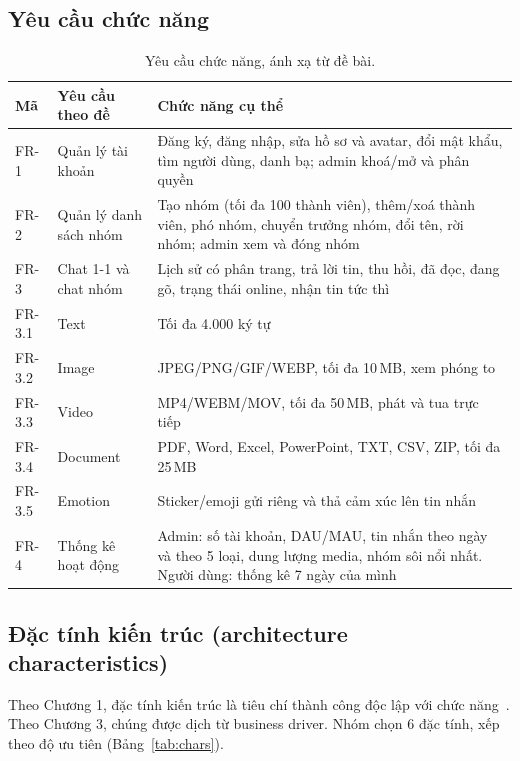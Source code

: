 \documentclass[11pt, a4paper]{article}
\begin{document}
\subsection{Yêu cầu chức năng}
\begin{table}[H]
  \centering
  \small
  \caption{Yêu cầu chức năng, ánh xạ từ đề bài.}
  \label{tab:fr}
  \begin{tabularx}{\linewidth}{llY}
    \toprule
    \textbf{Mã} & \textbf{Yêu cầu theo đề} & \textbf{Chức năng cụ thể} \\
    \midrule
    FR-1 & Quản lý tài khoản & Đăng ký, đăng nhập, sửa hồ sơ và avatar, đổi mật khẩu, tìm người dùng, danh bạ; admin khoá/mở và phân quyền \\
    FR-2 & Quản lý danh sách nhóm & Tạo nhóm (tối đa 100 thành viên), thêm/xoá thành viên, phó nhóm, chuyển trưởng nhóm, đổi tên, rời nhóm; admin xem và đóng nhóm \\
    FR-3 & Chat 1-1 và chat nhóm & Lịch sử có phân trang, trả lời tin, thu hồi, đã đọc, đang gõ, trạng thái online, nhận tin tức thì \\
    FR-3.1 & Text & Tối đa 4.000 ký tự \\
    FR-3.2 & Image & JPEG/PNG/GIF/WEBP, tối đa 10\,MB, xem phóng to \\
    FR-3.3 & Video & MP4/WEBM/MOV, tối đa 50\,MB, phát và tua trực tiếp \\
    FR-3.4 & Document & PDF, Word, Excel, PowerPoint, TXT, CSV, ZIP, tối đa 25\,MB \\
    FR-3.5 & Emotion & Sticker/emoji gửi riêng và thả cảm xúc lên tin nhắn \\
    FR-4 & Thống kê hoạt động & Admin: số tài khoản, DAU/MAU, tin nhắn theo ngày và theo 5 loại, dung lượng media, nhóm sôi nổi nhất. Người dùng: thống kê 7 ngày của mình \\
    \bottomrule
  \end{tabularx}
\end{table}

\subsection{Đặc tính kiến trúc (architecture characteristics)}
\label{sec:characteristics}
Theo Chương 1, đặc tính kiến trúc là tiêu chí thành công độc lập với chức năng~\cite{richards2020fundamentals}. Theo Chương 3, chúng được dịch từ business driver. Nhóm chọn 6 đặc tính, xếp theo độ ưu tiên (Bảng~\ref{tab:chars}).
\end{document}
